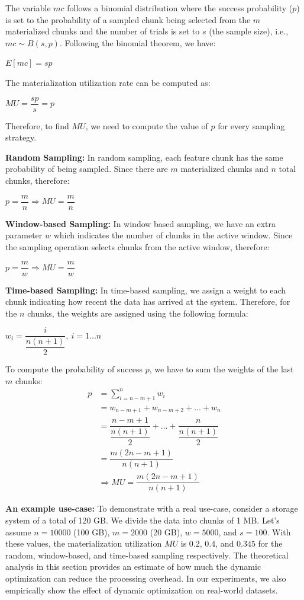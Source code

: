 The variable $mc$ follows a binomial distribution where the success probability ($p$) is set to the probability of a sampled chunk being selected from the $m$ materialized chunks and the number of trials is set to $s$  (the sample size), i.e., $mc  \sim B(s,p)$.
Following the binomial theorem, we have:
\begin{center}
$E[mc] = sp$
\end{center}
The materialization utilization rate can be computed as: 
\begin{center}
$MU = \dfrac{sp}{s} = p$
\end{center}
Therefore, to find $MU$, we need to compute the value of $p$ for every sampling strategy.

\textbf{Random Sampling:} 
In random sampling, each feature chunk has the same probability of being sampled.
Since there are $m$ materialized chunks and $n$ total chunks, therefore:
\begin{center}
$p = \dfrac{m}{n} \Rightarrow MU = \dfrac{m}{n}$ 
\end{center}

\textbf{Window-based Sampling:}
In window based sampling, we have an extra parameter $w$ which indicates the number of chunks in the active window.
Since the sampling operation selects chunks from the active window, therefore:
\begin{center}
$p = \dfrac{m}{w} \Rightarrow MU = \dfrac{m}{w}$ 
\end{center}

\textbf{Time-based Sampling:}
In time-based sampling, we assign a weight to each chunk indicating how recent the data has arrived at the system.
Therefore, for the $n$ chunks, the weights are assigned using the following formula:
\begin{center}
$w_i = \dfrac{i}{\dfrac{n(n+1)}{2}}, \ i = 1 ... n$
\end{center}
To compute the probability of success $p$, we have to sum the weights of the last $m$ chunks:
\begin{align*}
p &= \sum_{i=n-m+1}^{n} w_i\\
&=w_{n-m+1} + w_{n-m+2}+ ... + w_n\\
&=\dfrac{n-m+1}{\dfrac{n(n+1)}{2}} + ... + \dfrac{n}{\dfrac{n(n+1)}{2}} \\
&= \dfrac{m(2n-m+1)}{n(n+1)}\\
&\Rightarrow MU = \dfrac{m(2n-m+1)}{n(n+1)}
\end{align*}

\textbf{An example use-case:}
To demonstrate with a real use-case, consider a storage system of a total of 120 GB.
We divide the data into chunks of 1 MB. 
Let's assume $n=10000$ (100 GB), $m=2000$ (20 GB), $w=5000$, and $s=100$.
With these values, the materialization utilization $MU$ is $0.2$, $0.4$, and $0.345$ for the random, window-based, and time-based sampling respectively.
The theoretical analysis in this section provides an estimate of how much the dynamic optimization can reduce the processing overhead.
In our experiments, we also empirically show the effect of dynamic optimization on real-world datasets.

